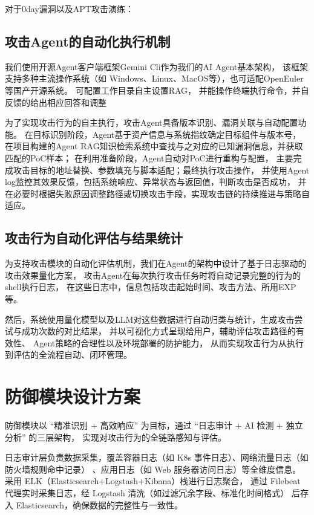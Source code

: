 \documentclass[lang=cn,10pt]{elegantbook}
\begin{document}
对于0day漏洞以及APT攻击演练：

\subsection{攻击Agent的自动化执行机制}
我们使用开源Agent客户端框架Gemini Cli作为我们的AI Agent基本架构，
该框架支持多种主流操作系统（如 Windows、Linux、MacOS等），也可适配OpenEuler等国产开源系统。
可配置工作目录自主设置RAG，
并能操作终端执行命令，并自反馈的给出相应回答和调整

为了实现攻击行为的自主执行，攻击Agent具备版本识别、漏洞关联与自动配置功能。
在目标识别阶段，Agent基于资产信息与系统指纹确定目标组件与版本号，
在项目构建的Agent RAG知识检索系统中查找与之对应的已知漏洞信息，并获取匹配的PoC样本；
在利用准备阶段，Agent自动对PoC进行重构与配置，
主要完成攻击目标的地址替换、参数填充与脚本适配；最终执行攻击操作，
并使用Agent log监控其效果反馈，包括系统响应、异常状态与返回值，判断攻击是否成功，
并在必要时根据失败原因调整路径或切换攻击手段，实现攻击链的持续推进与策略自适应。

\subsection{攻击行为自动化评估与结果统计}

为支持攻击模块的自动化评估机制，我们在Agent的架构中设计了基于日志驱动的攻击效果量化方案，
攻击Agent在每次执行攻击任务时将自动记录完整的行为的shell执行日志，
在这些日志中，信息包括攻击起始时间、攻击方法、所用EXP等。

然后，系统使用量化模型以及LLM对这些数据进行自动归类与统计，生成攻击尝试与成功次数的对比结果，
并以可视化方式呈现给用户，辅助评估攻击路径的有效性、
Agent策略的合理性以及环境部署的防护能力，
从而实现攻击行为从执行到评估的全流程自动、闭环管理。


\section{防御模块设计方案}
防御模块以 “精准识别 + 高效响应” 为目标，通过 “日志审计 + AI 检测 + 独立分析” 的三层架构，
实现对攻击行为的全链路感知与评估。​

日志审计层负责数据采集，覆盖容器日志（如 K8s 事件日志）、网络流量日志（如防火墙规则命中记录）
、应用日志（如 Web 服务器访问日志）等全维度信息。
采用 ELK（Elasticsearch+Logstash+Kibana）栈进行日志聚合，
通过 Filebeat 代理实时采集日志，经 Logstash 清洗（如过滤冗余字段、标准化时间格式）
后存入 Elasticsearch，确保数据的完整性与一致性。​
\end{document}
